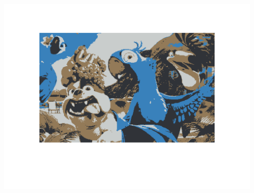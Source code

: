 \documentclass[fleqn]{article}
\begin{document}
\includegraphics[scale=0.4]{./pics/task1and2/rio_k=4_random/K=4_iteration_51_random_4_rio.png}\\
\end{document}
